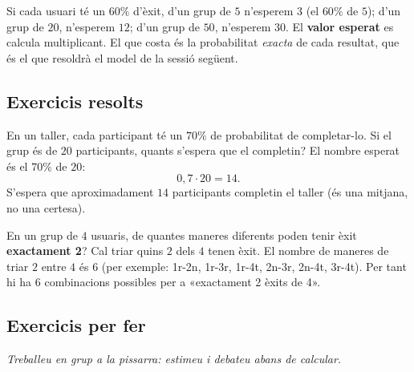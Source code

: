 \begin{exemple}
Si cada usuari té un $60\%$ d'èxit, d'un grup de $5$ n'esperem $3$ (el $60\%$ de $5$);
d'un grup de $20$, n'esperem $12$; d'un grup de $50$, n'esperem $30$. El \textbf{valor
esperat} es calcula multiplicant. El que costa és la probabilitat \emph{exacta} de cada
resultat, que és el que resoldrà el model de la sessió següent.
\end{exemple}

\subsection{Exercicis resolts}

\begin{exresolt}
En un taller, cada participant té un $70\%$ de probabilitat de completar-lo. Si el grup
és de $20$ participants, quants s'espera que el completin?
\solucio
El nombre esperat és el $70\%$ de $20$:
\[
0,7\cdot 20=14.
\]
S'espera que aproximadament $14$ participants completin el taller (és una mitjana, no una
certesa).
\end{exresolt}

\begin{exresolt}
En un grup de $4$ usuaris, de quantes maneres diferents poden tenir èxit \textbf{exactament
2}?
\solucio
Cal triar quins $2$ dels $4$ tenen èxit. El nombre de maneres de triar $2$ entre $4$ és
$6$ (per exemple: 1r-2n, 1r-3r, 1r-4t, 2n-3r, 2n-4t, 3r-4t). Per tant hi ha $6$
combinacions possibles per a «exactament 2 èxits de 4».
\end{exresolt}

\subsection{Exercicis per fer}

\noindent\textit{Treballeu en grup a la pissarra: estimeu i debateu abans de calcular.}

